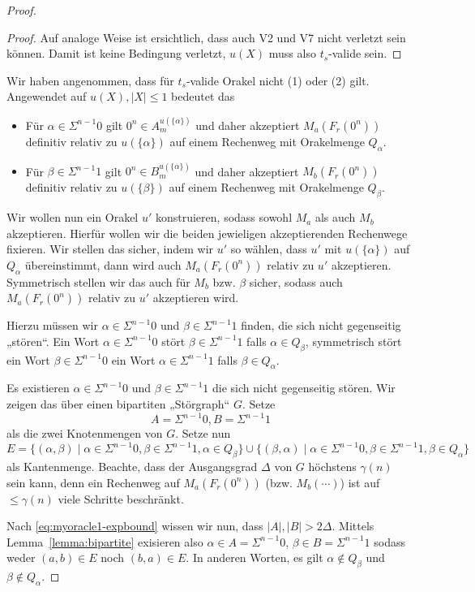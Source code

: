 \begin{proof}
\begin{proof}
    Auf analoge Weise ist ersichtlich, dass auch V2 und V7 nicht verletzt sein können.
    Damit ist keine Bedingung verletzt, $u(X)$ muss also $t_s$-valide sein.
\end{proof}

Wir haben angenommen, dass für $t_{s}$-valide Orakel nicht (1) oder (2) gilt. Angewendet auf $u(X), |X|\leq 1$ bedeutet das
\begin{itemize}[nosep]
    \item Für $\alpha\in \Sigma^{n-1}0$ gilt $0^n\in A_m^{u(\{\alpha\})}$ und daher akzeptiert $M_a(F_r(0^n))$ definitiv relativ zu $u(\{\alpha\})$ auf einem Rechenweg mit Orakelmenge $Q_\alpha$.
    \item Für $\beta\in \Sigma^{n-1}1$ gilt $0^n\in B_m^{u(\{\alpha\})}$ und daher akzeptiert $M_b(F_r(0^n))$ definitiv relativ zu $u(\{\beta\})$ auf einem Rechenweg mit Orakelmenge $Q_\beta$.
\end{itemize}
Wir wollen nun ein Orakel $u'$ konstruieren, sodass sowohl $M_a$ als auch $M_b$ akzeptieren.
Hierfür wollen wir die beiden jewieligen akzeptierenden Rechenwege fixieren.
Wir stellen das sicher, indem wir $u'$ so wählen, dass $u'$ mit $u(\{\alpha\})$ auf $Q_\alpha$ übereinstimmt, dann wird auch $M_a(F_r(0^n))$ relativ zu $u'$ akzeptieren.
Symmetrisch stellen wir das auch für $M_b$ bzw. $\beta$ sicher, sodass auch $M_a(F_r(0^n))$ relativ zu $u'$ akzeptieren wird.

Hierzu müssen wir $\alpha\in\Sigma^{n-1}0$ und $\beta\in\Sigma^{n-1}1$ finden, die sich nicht gegenseitig „stören“.
Ein Wort $\alpha\in\Sigma^{n-1}0$ stört $\beta\in\Sigma^{n-1}1$ falls $\alpha\in Q_\beta$, 
symmetrisch stört ein Wort $\beta\in\Sigma^{n-1}0$ ein Wort  $\alpha\in\Sigma^{n-1}1$ falls $\beta\in Q_\alpha$.

Es existieren $\alpha\in\Sigma^{n-1}0$ und $\beta\in\Sigma^{n-1}1$ die sich nicht gegenseitig stören. Wir zeigen das über einen bipartiten „Störgraph“ $G$.
Setze 
\[ A=\Sigma^{n-1}0, B=\Sigma^{n-1}1 \]
als die zwei Knotenmengen von $G$.
Setze nun
\[ E = \{ (\alpha, \beta) \mid \alpha\in\Sigma^{n-1}0, \beta\in\Sigma^{n-1}1, \alpha\in Q_\beta\} \cup \{ (\beta, \alpha) \mid \alpha\in\Sigma^{n-1}0, \beta\in\Sigma^{n-1}1, \beta\in Q_\alpha\} \]
als Kantenmenge.
Beachte, dass der Ausgangsgrad $\Delta$ von $G$ höchstens $\gamma(n)$ sein kann, denn ein Rechenweg auf $M_a(F_r(0^n))$ (bzw. $M_b(\cdots)$) ist auf $\leq \gamma(n)$ viele Schritte beschränkt.

Nach \eqref{eq:myoracle1-expbound} wissen wir nun, dass $|A|, |B|>2\Delta$. Mittels Lemma~\ref{lemma:bipartite} exisieren also $\alpha\in A = \Sigma^{n-1}0$, $\beta\in B=\Sigma^{n-1}1$ sodass weder $(a,b)\in E$ noch $(b,a)\in E$.
In anderen Worten, es gilt $\alpha\not\in Q_\beta$ und $\beta\not\in Q_\alpha$.


\end{proof}
